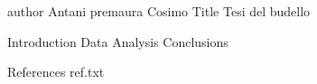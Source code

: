
author Antani premaura Cosimo
Title Tesi del budello

Introduction 
Data
Analysis
Conclusions

References
ref.txt
